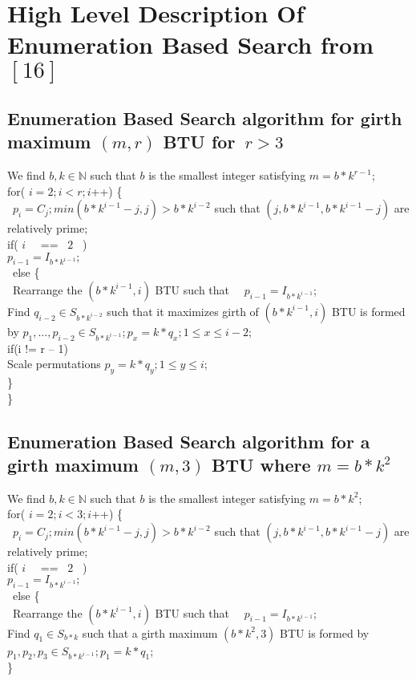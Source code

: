\documentclass{llncs}
\begin{document}
\section {High Level Description Of Enumeration Based Search from $[16]$}
\subsection{Enumeration Based Search algorithm for girth maximum $(m, r)$ BTU for\ $r>3$} 
We find $b,k\in \mathbb{N}$ such that $b$ is the smallest integer satisfying $m=b\ast k^{r-1}$; \\
for(  $i=2;i<r;i$++) \{ \\
\  $p_{i}=C_{j};\mathit{min}(b\ast k^{i-1}-j,j)>b\ast k^{i-2}$ such that $(j,b\ast k^{i-1},b\ast k^{i-1}-j)$ are relatively prime; \\
if( $i$ \ \ == \  $2$ \ ) \\
$p_{i-1}=I_{b\ast k^{i-1}};$  \\
\ else \{ \\
\ Rearrange the $(b\ast k^{i-1},i)$ BTU such that \ \  $p_{i-1}=I_{b\ast k^{i-1}}$; \\
Find $q_{i-2}\in S_{b\ast k^{i-2}}$ such that it maximizes girth of  $(b\ast k^{i-1},i)$ BTU is formed by  $p_{1},\ldots ,p_{i-2}\in S_{b\ast k^{i-1}};p_{x}=k\ast q_{x};1\le x\le i-2$; \\
if(i != r -- 1) \\
Scale permutations $p_{y}=k\ast q_{y};1\le y\le i$; \\
\} \\
\}

\subsection{Enumeration Based Search algorithm for a girth maximum $(m, 3)$ BTU  where $ m = b \ast k^{2}$}
We find $b,k\in \mathbb{N}$ such that $b$ is the smallest integer satisfying $m=b\ast k^{2}$; \\
for(  $i=2;i<3;i$++) \{ \\
\  $p_{i}=C_{j};\mathit{min}(b\ast k^{i-1}-j,j)>b\ast k^{i-2}$ such that $(j,b\ast k^{i-1},b\ast k^{i-1}-j)$ are relatively prime; \\
if( $i$ \ \ == \  $2$ \ ) \\
$p_{i-1}=I_{b\ast k^{i-1}};$  \\
\ else \{ \\
\ Rearrange the $(b\ast k^{i-1},i)$ BTU such that \ \  $p_{i-1}=I_{b\ast k^{i-1}}$; \\
Find $q_{1} \in S_{b\ast k}$ such that a girth maximum  $(b\ast k^{2},3)$ BTU is formed by  $p_{1}, p_{2}, p_{3}\in S_{b\ast k^{i-1}};p_{1}=k\ast q_{1}$; \\
\}
\end{document}

